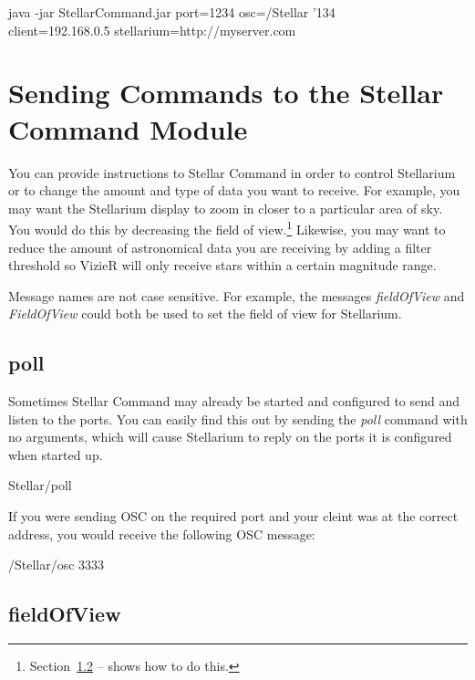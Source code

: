  \begin{syntax}
	\medskip
	java -jar StellarCommand.jar port=1234 osc=/Stellar  {\char'134}\\client=192.168.0.5 stellarium=http://myserver.com\\
	\medskip
\end{syntax}
\bigskip

\section{Sending Commands to the Stellar Command Module}
You can provide instructions to Stellar Command in order to control Stellarium or to change the amount and type of data you want to receive. For example, you may want the Stellarium display to zoom in closer to a particular area of sky. You would do this by decreasing the field of view.\footnote{Section~\ref{subsec:fieldofview} --
	\emph{} shows how to do this.} Likewise, you may want to reduce the amount of astronomical data you are receiving by adding a filter threshold so VizieR will only receive stars within a certain magnitude range. 

Message names are not case sensitive. For example, the messages \textit{fieldOfView} and \textit{FieldOfView} could both be used to set the field of view for Stellarium.

\subsection{poll}
Sometimes Stellar Command may already be started and configured to send and listen to the ports. You can easily find this out by sending the \textit{poll} command with no arguments, which will cause Stellarium to reply on the ports it is configured when started up.

 \begin{syntax}
	\medskip
	Stellar/poll
	\medskip
\end{syntax}

If you were sending OSC on the required port and your cleint was at the correct address, you would receive the following OSC message:
\begin{syntax}
	/Stellar/osc 3333  \\
\end{syntax}
\bigskip


\subsection{fieldOfView}\label{subsec:fieldofview}


